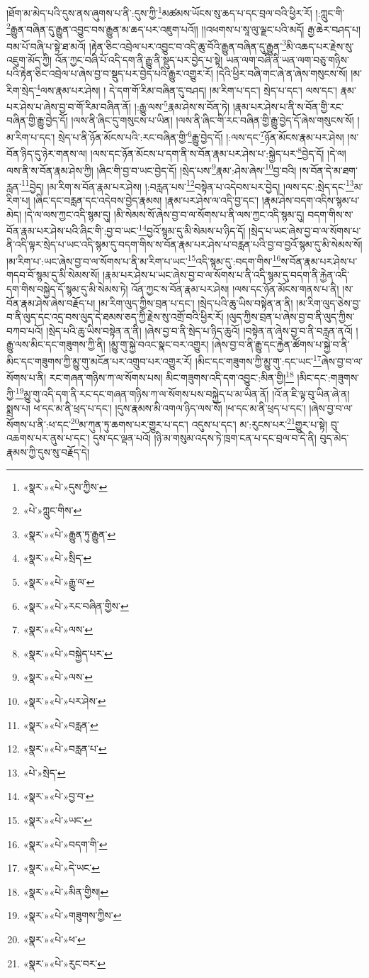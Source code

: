 །ཐོག་མ་མེད་པའི་དུས་ནས་ཞུགས་པ་ནི་:དུས་ཀྱི་\footnote{«སྣར་»«པེ་»དུས་ཀྱིས་}མཚམས་ཡོངས་སུ་ཆད་པ་དང་བྲལ་བའི་ཕྱིར་རོ། །:ཀླུང་གི་\footnote{«པེ་»ཀླུང་གིས་}རྒྱུན་བཞིན་དུ་རྒྱུན་འབྱུང་བས་རྒྱུན་མ་ཆད་པར་འཇུག་པའོ།། །།འཕགས་པ་སཱ་ལུ་ལྗང་པའི་མདོ། རྒྱ་ཆེར་བཤད་པ། བམ་པོ་བཞི་པ་སྟེ་ཐ་མའོ། །རྟེན་ཅིང་འབྲེལ་པར་འབྱུང་བ་འདི་ཆུ་བོའི་རྒྱུན་བཞིན་དུ་རྒྱུན་\footnote{«སྣར་»«པེ་»རྒྱུན་ཏུ་རྒྱུན་}མི་འཆད་པར་རྗེས་སུ་འཇུག་མོད་ཀྱི། འོན་ཀྱང་བཞི་པོ་འདི་དག་ནི་རྒྱུ་ནི་སྡུད་པར་བྱེད་པ་སྟེ། ཡན་ལག་བཞི་ནི་ཡན་ལག་བཅུ་གཉིས་པའི་རྟེན་ཅིང་འབྲེལ་པ་ཞེས་བྱ་བ་སྡུད་པར་བྱེད་པའི་རྒྱུར་འགྱུར་རོ། །དེའི་ཕྱིར་བཞི་གང་ཞེ་ན་ཞེས་གསུངས་སོ། །མ་རིག་སྲེད་\footnote{«སྣར་»«པེ་»སྲིད་}ལས་རྣམ་པར་ཤེས། །
དེ་དག་གོ་རིམ་བཞིན་དུ་བཤད། །མ་རིག་པ་དང་། སྲེད་པ་དང་། ལས་དང་། རྣམ་པར་ཤེས་པ་ཞེས་བྱ་བ་གོ་རིམ་བཞིན་ནོ། །:རྒྱུ་ལས་\footnote{«སྣར་»«པེ་»རྒྱུ་ལ་}རྣམ་ཤེས་ས་བོན་ཏེ། །རྣམ་པར་ཤེས་པ་ནི་ས་བོན་གྱི་རང་བཞིན་གྱི་རྒྱུ་བྱེད་དོ། །ལས་ནི་ཞིང་དུ་གསུངས་པ་ཡིན། །ལས་ནི་ཞིང་གི་རང་བཞིན་གྱི་རྒྱུ་བྱེད་དོ་ཞེས་གསུངས་སོ། །མ་རིག་པ་དང་། སྲེད་པ་ནི་ཉོན་མོངས་པའི་:རང་བཞིན་གྱི་\footnote{«སྣར་»«པེ་»རང་བཞིན་གྱིས་}རྒྱུ་བྱེད་དོ། །:ལས་དང་\footnote{«སྣར་»«པེ་»ལས་}ཉོན་མོངས་རྣམ་པར་ཤེས། །ས་བོན་ཉིད་དུ་ཉེར་གནས་ལ། །ལས་དང་ཉོན་མོངས་པ་དག་ནི་ས་བོན་རྣམ་པར་ཤེས་པ་:སྐྱེད་པར་\footnote{«སྣར་»«པེ་»བསྐྱེད་པར་}བྱེད་དོ། །དེ་ལ། ལས་ནི་ས་བོན་རྣམ་ཤེས་ཀྱི། །ཞིང་གི་བྱ་བ་ཡང་བྱེད་དོ། །སྲེད་པས་\footnote{«སྣར་»«པེ་»ལས་}རྣམ་:ཤེས་ཞེས་\footnote{«སྣར་»«པེ་»པར་ཤེས་}བྱ་བའི། །ས་བོན་དེ་མ་ཐག་རླན་\footnote{«སྣར་»«པེ་»བརླན་}བྱེད། །མ་རིག་ས་བོན་རྣམ་པར་ཤེས། །:བརླན་པས་\footnote{«སྣར་»«པེ་»བརླན་པ་}བསྟེན་པ་འདེབས་པར་བྱེད། །ལས་དང་:སྲེད་དང་\footnote{«པེ་»སྲེད་}མ་རིག་པ། །ཞིང་དང་བརླན་དང་འདེབས་བྱེད་རྣམས། །རྣམ་པར་ཤེས་ལ་འདི་བྱ་དང་། །རྣམ་ཤེས་བདག་འདིས་སྙམ་པ་མེད། །དེ་ལ་ལས་ཀྱང་འདི་སྙམ་དུ། །མི་སེམས་སོ་ཞེས་བྱ་བ་ལ་སོགས་པ་ནི་ལས་ཀྱང་འདི་སྙམ་དུ། བདག་གིས་ས་བོན་རྣམ་པར་ཤེས་པའི་ཞིང་གི་:བྱ་བ་ཡང་\footnote{«སྣར་»«པེ་»བྱ་བ་}བྱའོ་སྙམ་དུ་མི་སེམས་པ་ཉིད་དོ། །སྲེད་པ་ཡང་ཞེས་བྱ་བ་ལ་སོགས་པ་ནི་འདི་ལྟར་སྲེད་པ་ཡང་འདི་སྙམ་དུ་བདག་གིས་ས་བོན་རྣམ་པར་ཤེས་པ་བརླན་པའི་བྱ་བ་བྱའོ་སྙམ་དུ་མི་སེམས་སོ། །མ་རིག་པ་:ཡང་ཞེས་བྱ་བ་ལ་སོགས་པ་ནི་མ་རིག་པ་ཡང་\footnote{«སྣར་»«པེ་»ཡང་}འདི་སྙམ་དུ་:བདག་གིས་\footnote{«སྣར་»«པེ་»བདག་གི་}ས་བོན་རྣམ་པར་ཤེས་པ་གདབ་བོ་སྙམ་དུ་མི་སེམས་སོ། །རྣམ་པར་ཤེས་པ་ཡང་ཞེས་བྱ་བ་ལ་སོགས་པ་ནི་འདི་སྙམ་དུ་བདག་ནི་རྐྱེན་འདི་དག་གིས་བསྐྱེད་དོ་སྙམ་དུ་མི་སེམས་ཏེ། འོན་ཀྱང་ས་བོན་རྣམ་པར་ཤེས། །ལས་དང་ཉོན་མོངས་གནས་པ་ནི། །ས་བོན་རྣམ་ཤེས་ཞེས་བརྗོད་པ། །མ་རིག་ལུད་ཀྱིས་བྲན་པ་དང་། །སྲེད་པའི་ཆུ་ཡིས་བསྟེན་ན་ནི། །མ་རིག་ལུད་ཅེས་བྱ་བ་ནི་ལུད་དང་འདྲ་བས་ལུད་དེ་ཐམས་ཅད་ཀྱི་རྗེས་སུ་འགྲོ་བའི་ཕྱིར་རོ། །ལུད་ཀྱིས་བྲན་པ་ཞེས་བྱ་བ་ནི་ལུད་ཀྱིས་བཀབ་པའོ། །སྲེད་པའི་ཆུ་ཡིས་བསྟེན་ན་ནི། །ཞེས་བྱ་བ་ནི་སྲེད་པ་ཉིད་ཆུའོ། །བསྟེན་ན་ཞེས་བྱ་བ་ནི་བརླན་ནའོ། །རྒྱུ་ལས་མིང་དང་གཟུགས་ཀྱི་ནི། །མྱུ་གུ་སྐྱེ་བའང་སྣང་བར་འགྱུར། །ཞེས་བྱ་བ་ནི་རྒྱུ་དང་རྐྱེན་ཚོགས་པ་སྐྱེ་བ་ནི་མིང་དང་གཟུགས་ཀྱི་མྱུ་གུ་མངོན་པར་འགྲུབ་པར་འགྱུར་རོ། །མིང་དང་གཟུགས་ཀྱི་མྱུ་གུ་:དང་ཡང་\footnote{«སྣར་»«པེ་»དེ་ཡང་}ཞེས་བྱ་བ་ལ་སོགས་པ་ནི། རང་གཞན་གཉིས་ཀ་ལ་སོགས་པས། མིང་གཟུགས་འདི་དག་འབྱུང་:མིན་གྱི།\footnote{«སྣར་»«པེ་»མིན་གྱིས།} །མིང་དང་:གཟུགས་ཀྱི་\footnote{«སྣར་»«པེ་»གཟུགས་ཀྱིས་}མྱུ་གུ་འདི་དག་ནི་རང་དང་གཞན་གཉིས་ཀ་ལ་སོགས་པས་བསྐྱེད་པ་མ་ཡིན་ནོ། །འོ་ན་ཇི་ལྟ་བུ་ཡིན་ཞེ་ན། སྨྲས་པ། ཕ་དང་མ་ནི་ཕྲད་པ་དང་། །དུས་རྣམས་མི་འགལ་ཉིད་ལས་སོ། །ཕ་དང་མ་ནི་ཕྲད་པ་དང་། །ཞེས་བྱ་བ་ལ་སོགས་པ་ནི་:ཕ་དང་\footnote{«སྣར་»«པེ་»ཕ་}མ་ཀུན་ཏུ་ཆགས་པར་གྱུར་པ་དང་། འདུས་པ་དང་། མ་:རུངས་པར་\footnote{«སྣར་»«པེ་»རུང་བར་}གྱུར་པ་སྟེ། བུ་འཆགས་པར་ནུས་པ་དང་། དུས་དང་ལྡན་པའོ། །ཉི་མ་གསུམ་འདས་ཏེ་ཁྲག་ངན་པ་དང་བྲལ་བ་དེ་ནི། བུད་མེད་རྣམས་ཀྱི་དུས་སུ་བརྗོད་དེ། 